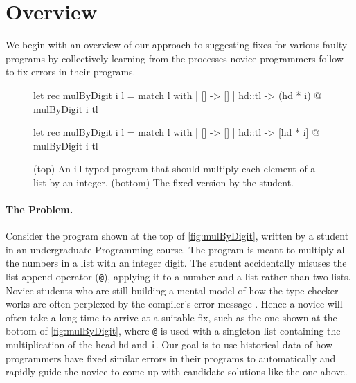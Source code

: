 \section{Overview}
\label{sec:overview}

We begin with an overview of our approach to suggesting fixes for various faulty
programs by collectively learning from the processes novice programmers follow
to fix errors in their programs.

\begin{figure}[ht]
\begin{ecode}
let rec mulByDigit i l =
  match l with
  | []     -> []
  | hd::tl -> (hd * i) @ mulByDigit i tl
\end{ecode}

\begin{ecode}
let rec mulByDigit i l =
  match l with
  | []     -> []
  | hd::tl -> [hd * i] @ mulByDigit i tl
\end{ecode}
\caption{(top) An ill-typed \ocaml program that should multiply each element
of a list by an integer. (bottom) The fixed version by the student.}
\label{fig:mulByDigit}
\end{figure}


\paragraph{The Problem.} Consider the program \mbd shown at the top of
\autoref{fig:mulByDigit}, written by a student in an undergraduate Programming
course. The program is meant to multiply all the numbers in a list with an
integer digit. The student accidentally misuses the list append operator
(\texttt{@}), applying it to a number and a list rather than two lists.
%
Novice students who are still building a mental model of how the type checker
works are often perplexed by the compiler's error message \citep{Munson_2016}.
Hence a novice will often take a long time to arrive at a suitable fix, such as
the one shown at the bottom of \autoref{fig:mulByDigit}, where \texttt{@} is
used with a singleton list containing the multiplication of the head \texttt{hd}
and \texttt{i}.
%
Our goal is to use historical data of how programmers have fixed similar errors
in their programs to automatically and rapidly guide the novice to come up with
candidate solutions like the one above.


